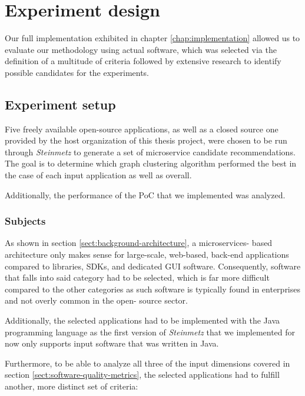 \documentclass[12pt,a4paper]{report}
\begin{document}
\chapter{Experiment design} \label{chap:experiment-design}

Our full implementation exhibited in chapter \ref{chap:implementation} allowed
us to evaluate our methodology using actual software, which was selected via
the definition of a multitude of criteria followed by extensive research to
identify possible candidates for the experiments.



\section{Experiment setup}

Five freely available open-source applications, as well as a closed source one
provided by the host organization of this thesis project, were chosen to be run
through \textit{Steinmetz} to generate a set of microservice candidate
recommendations. The goal is to determine which graph clustering algorithm
performed the best in the case of each input application as well as overall.

Additionally, the performance of the PoC that we implemented was analyzed.


\subsection{Subjects}

As shown in section \ref{sect:background-architecture}, a microservices\hyp
based architecture only makes sense for large\hyp scale, web\hyp based,
back\hyp end applications compared to libraries, SDKs, and dedicated GUI
software. Consequently, software that falls into said category had to be
selected, which is far more difficult compared to the other categories as such
software is typically found in enterprises and not overly common in the open-
source sector.

Additionally, the selected applications had to be implemented with the Java
programming language as the first version of \textit{Steinmetz} that we
implemented for now only supports input software that was written in Java.

Furthermore, to be able to analyze all three of the input dimensions covered in
section \ref{sect:software-quality-metrics}, the selected applications had to
fulfill another, more distinct set of criteria:
\end{document}
